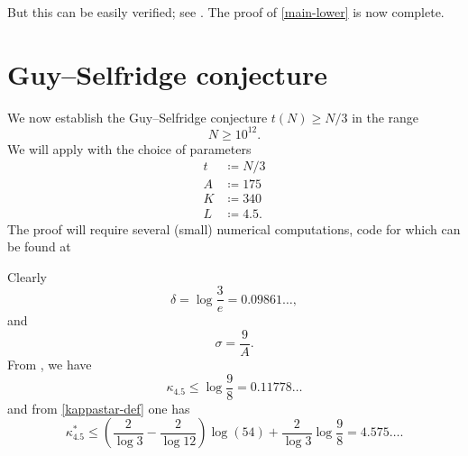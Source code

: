 \documentclass[12pt,a4paper,reqno]{amsart}
\numberwithin{equation}{section}
\theoremstyle{plain}
\theoremstyle{definition}
\begin{document}
But this can be easily verified; see .  The proof of \eqref{main-lower} is now complete.

\section{Guy--Selfridge conjecture}

We now establish the Guy--Selfridge conjecture $t(N) \geq N/3$ in the range
$$ N \geq 10^{12}.$$
We will apply  with the choice of parameters
\begin{align*}
  t &\coloneqq N/3\\
  A &\coloneqq 175\\
  K &\coloneqq 340 \\
  L &\coloneqq 4.5.
\end{align*}
The proof will require several (small) numerical computations, code for which can be found at \url{}


Clearly 
\begin{equation}\label{delta-exact}
  \delta = \log \frac{3}{e} = 0.09861\dots, 
\end{equation}
and
$$ \sigma = \frac{9}{A}.$$
From , we have
\begin{equation}\label{kappa-k}
  \kappa_{4.5} \leq \log \frac{9}{8} = 0.11778\dots
\end{equation}
and from \eqref{kappastar-def} one has
\begin{equation}\label{kappa-star-def}
 \kappa^*_{4.5} \leq (\frac{2}{\log 3} - \frac{2}{\log 12}) \log(54) + \frac{2}{\log 3} \log \frac{9}{8} = 4.575\dots.
\end{equation}
\end{document}
